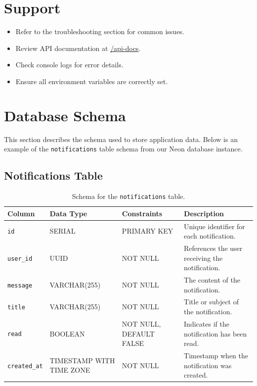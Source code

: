 \section{Support}
\begin{itemize}
    \item Refer to the troubleshooting section for common issues.
    \item Review API documentation at \url{/api-docs}.
    \item Check console logs for error details.
    \item Ensure all environment variables are correctly set.
\end{itemize}


\section{Database Schema}

This section describes the schema used to store application data. Below is an example of the \texttt{notifications} table schema from our Neon database instance.

\subsection{Notifications Table}

\begin{table}[H]
\centering
\begin{tabular}{|l|l|l|l|}
\hline
\textbf{Column} & \textbf{Data Type} & \textbf{Constraints} & \textbf{Description} \\
\hline
\texttt{id} & SERIAL & PRIMARY KEY & Unique identifier for each notification. \\
\hline
\texttt{user\_id} & UUID & NOT NULL & References the user receiving the notification. \\
\hline
\texttt{message} & VARCHAR(255) & NOT NULL & The content of the notification. \\
\hline
\texttt{title} & VARCHAR(255) & NOT NULL & Title or subject of the notification. \\
\hline
\texttt{read} & BOOLEAN & NOT NULL, DEFAULT FALSE & Indicates if the notification has been read. \\
\hline
\texttt{created\_at} & TIMESTAMP WITH TIME ZONE & NOT NULL & Timestamp when the notification was created. \\
\hline
\end{tabular}
\caption{Schema for the \texttt{notifications} table.}
\end{table}




